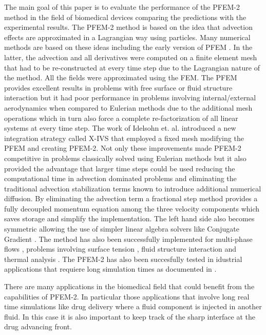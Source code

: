The main goal of this paper is to evaluate the performance of the PFEM-2 method in the field of biomedical devices comparing the predictions with the experimental results. The PFEM-2 method is based on the idea that advection effects are approximated in a Lagrangian way using particles. Many numerical methods are based on these ideas \cite{sph,pic,mac,mps,mpm} including the early version of PFEM \cite{sergio:pfem}. In the latter, the advection and all derivatives were computed on a finite element mesh that had to be re-constructed at every time step due to the Lagrangian nature of the method. All the fields were approximated using the FEM. The PFEM provides excellent results in problems with free surface or fluid structure interaction but it had poor performance in problems involving internal/external aerodynamics when compared to Eulerian methods due to the additional mesh operations which in turn also force a complete re-factorization of all linear systems at every time step. The work of Idelsohn et. al. \cite{sergio:xivs1,sergio:xivs2} introduced a new integration strategy called X-IVS that employed a fixed mesh modifying the PFEM and creating PFEM-2. Not only these improvements made PFEM-2 competitive in problems classically solved using Eulerian methods but it also provided the advantage that larger time steps could be used \cite{gimenez:parallel} reducing the computational time in advection dominated problems and eliminating the traditional advection stabilization terms known to introduce additional numerical diffusion. By eliminating the advection term a fractional step method provides a fully decoupled momentum equation among the three velocity components which saves storage and simplify the implementation. The left hand side also becomes symmetric allowing the use of simpler linear algebra solvers like Conjugate Gradient \cite{conjgrad}. The method has also been successfully implemented for multi-phase flows \cite{sergio:pfem2_lts,gimenez:fs,gimenez:tesis,salazar}, problems involving surface tension \cite{gimenez:st}, fluid structure interaction \cite{pablo:FSI} and thermal analysis \cite{marti}. The PFEM-2 has also been succesfully tested in idustrial applications that requiere long simulation times as documented in \cite{gimenez:ind}.

There are many applications in the biomedical field that could benefit from the capabilities of PFEM-2. In particular those applications that involve long real time simulations like drug delivery where a fluid component is injected in another fluid. In this case it is also important to keep track of the sharp interface at the drug advancing front.


